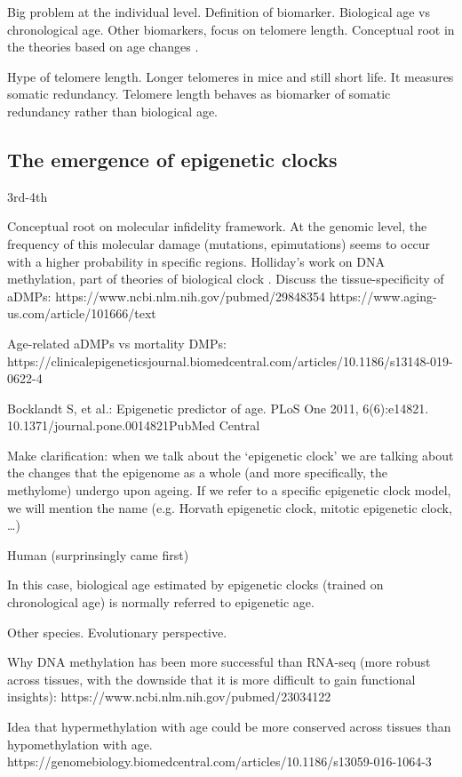 Big problem at the individual level. Definition of biomarker. Biological age vs chronological age. Other biomarkers, focus on telomere length. 
Conceptual root in the theories based on age changes \cite{Medvedev1990}.

Hype of telomere length. Longer telomeres in mice and still short life.
It measures somatic redundancy. Telomere length behaves as biomarker of somatic redundancy rather than biological age.

\subsection{The emergence of epigenetic clocks}

3rd-4th

Conceptual root on molecular infidelity framework. At the genomic level, the frequency of this molecular damage (mutations, epimutations) seems to occur with a higher probability in specific regions. 
Holliday's work on DNA methylation, part of theories of biological clock \cite{Medvedev1990}. 
Discuss the tissue-specificity of aDMPs:
https://www.ncbi.nlm.nih.gov/pubmed/29848354
https://www.aging-us.com/article/101666/text

Age-related aDMPs vs mortality DMPs:
https://clinicalepigeneticsjournal.biomedcentral.com/articles/10.1186/s13148-019-0622-4

Bocklandt S, et al.: Epigenetic predictor of age. PLoS One 2011, 6(6):e14821. 10.1371/journal.pone.0014821PubMed Central

Make clarification: when we talk about the ‘epigenetic clock’ we are talking about the changes that the epigenome as a whole (and more specifically, the methylome) undergo upon ageing. If we refer to a specific epigenetic clock model, we will mention the name (e.g. Horvath epigenetic clock, mitotic epigenetic clock, …)

Human (surprinsingly came first)

In this case, biological age estimated by epigenetic clocks (trained on chronological age) is normally referred to epigenetic age. 

Other species. Evolutionary perspective.

Why DNA methylation has been more successful than RNA-seq (more robust across tissues, with the downside that it is more difficult to gain functional insights): https://www.ncbi.nlm.nih.gov/pubmed/23034122

Idea that hypermethylation with age could be more conserved across tissues than hypomethylation with age.
https://genomebiology.biomedcentral.com/articles/10.1186/s13059-016-1064-3

